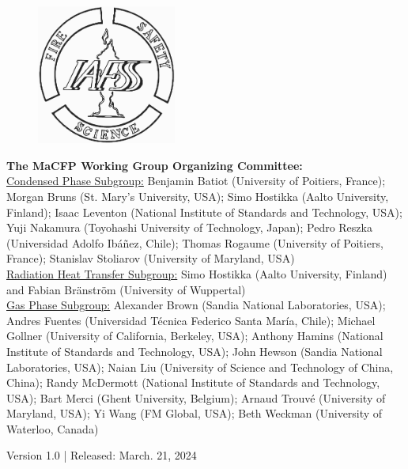 \documentclass[12pt]{article}
\begin{document}
\begin{minipage}{0.25\textwidth}
\begin{figure}[H]
\includegraphics[width=1.8in]{../IAFSSLogo.pdf}
\end{figure}
\end{minipage} \hfill
\begin{minipage}{0.65\textwidth}
\begin{flushright}
\begin{small}
{\bf The MaCFP Working Group Organizing Committee:} \\
{\footnotesize \underline{Condensed Phase Subgroup:} Benjamin Batiot (University of Poitiers, France); Morgan Bruns (St. Mary's University, USA); Simo Hostikka (Aalto University, Finland); Isaac Leventon (National Institute of Standards and Technology, USA); Yuji Nakamura (Toyohashi University of Technology, Japan); Pedro Reszka (Universidad Adolfo Ibáñez, Chile); Thomas Rogaume (University of Poitiers, France); Stanislav Stoliarov (University of Maryland, USA)}\\
{\footnotesize  \underline{Radiation Heat Transfer Subgroup:} Simo Hostikka (Aalto University, Finland) and Fabian Bränström (University of Wuppertal)}\\
{\footnotesize \underline{Gas Phase Subgroup:} Alexander Brown (Sandia National Laboratories, USA); Andres Fuentes (Universidad Técnica Federico Santa María, Chile); Michael Gollner (University of California, Berkeley, USA); Anthony Hamins (National Institute of Standards and Technology, USA); John Hewson (Sandia National Laboratories, USA); Naian Liu (University of Science and Technology of China, China); Randy McDermott (National Institute of Standards and Technology, USA); Bart Merci (Ghent University, Belgium); Arnaud Trouvé (University of Maryland, USA); Yi Wang (FM Global, USA); Beth Weckman (University of Waterloo, Canada)}


\end{small}
\end{flushright}
\end{minipage}
\begin{small}
Version 1.0 | Released: March. 21, 2024\\
\end{small}
\newpage
\thispagestyle{empty}
\tableofcontents
\end{document}
